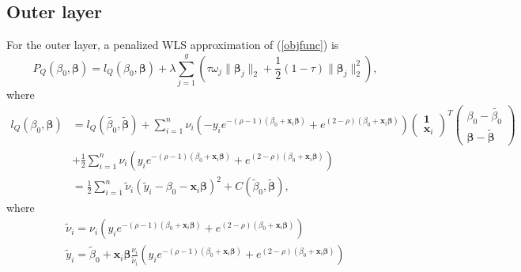 \documentclass[paper=a4, fontsize=11pt]{scrartcl} %
\begin{document}
\subsection*{\textbf{Outer layer}}
For the outer layer, a penalized WLS approximation of (\ref{objfunc}) is
\begin{equation}\label{objapprox}
P_{Q}(\beta_{0},\boldsymbol{\beta})=l_{Q}(\beta_{0},\boldsymbol{\beta})+\lambda\sum_{j=1}^{g}(\tau\omega_{j}\|\boldsymbol{\beta}_{j}\|_{2}+\frac{1}{2}(1-\tau)\|\boldsymbol{\beta}_{j}\|_{2}^{2}),
\end{equation}
where
\begin{equation*}
\begin{split}
l_{Q}(\beta_{0},\boldsymbol{\beta})&=l_{Q}(\tilde{\beta_{0}},\tilde{\boldsymbol{\beta}})+\sum_{i=1}^{n}{\nu_{i}(-y_{i}e^{-(\rho-1)(\beta_{0}+\boldsymbol{x}_{i}\boldsymbol{\beta})}+e^{(2-\rho)(\beta_{0}+\boldsymbol{x}_{i}\boldsymbol{\beta})})\begin{pmatrix}\boldsymbol{1}\\ \boldsymbol{x}_{i}\end{pmatrix}^{T}\begin{pmatrix}\beta_{0}-\tilde{\beta_{0}}\\ \boldsymbol{\beta}-\tilde{\boldsymbol{\beta}}\end{pmatrix}}\\
&+\frac{1}{2}\sum_{i=1}^{n}{\nu_{i}(y_{i}e^{-(\rho-1)(\beta_{0}+\boldsymbol{x}_{i}\boldsymbol{\beta})}+e^{(2-\rho)(\beta_{0}+\boldsymbol{x}_{i}\boldsymbol{\beta})})}\\
&=\frac{1}{2}\sum_{i=1}^{n}{\tilde{\nu}_{i}(\tilde{y}_{i}-\beta_{0}-\boldsymbol{x}_{i}\boldsymbol{\beta})^{2}}+C(\tilde{\beta}_{0},\tilde{\boldsymbol{\beta}}),
\end{split}
\end{equation*}
where
\begin{equation}
\begin{split}
\tilde{\nu}_{i}=\nu_{i}(y_{i}e^{-(\rho-1)(\beta_{0}+\boldsymbol{x}_{i}\boldsymbol{\beta})}+e^{(2-\rho)(\beta_{0}+\boldsymbol{x}_{i}\boldsymbol{\beta})})\\
\tilde{y}_{i}=\tilde{\beta}_{0}+\boldsymbol{x}_{i}\boldsymbol{\beta}\frac{\nu_{i}}{\tilde{\nu}_{i}}(y_{i}e^{-(\rho-1)(\beta_{0}+\boldsymbol{x}_{i}\boldsymbol{\beta})}+e^{(2-\rho)(\beta_{0}+\boldsymbol{x}_{i}\boldsymbol{\beta})})
\end{split}
\end{equation}
\end{document}
